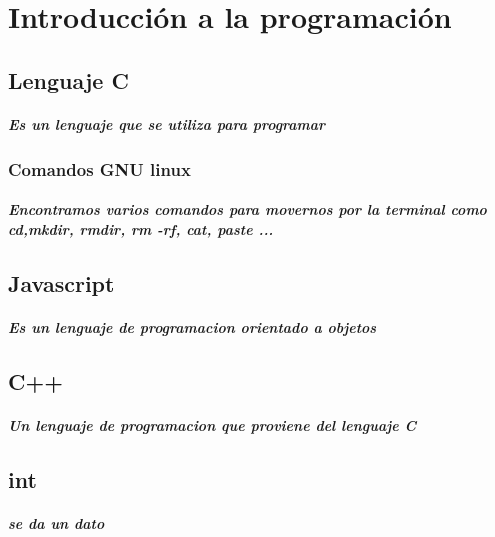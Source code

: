 \documentclass[10pt,a4paper]{book}
\begin{document}
\chapter{Introducción a la programación}
	\section{Lenguaje C} 
		\paragraph{Es un lenguaje que se utiliza para programar}
			\subsection{Comandos GNU linux}
				\paragraph{Encontramos varios comandos para movernos por la 								terminal como cd,mkdir, rmdir, rm -rf, cat, paste ...}    
	\section{Javascript}
		\paragraph{Es un lenguaje de programacion orientado a objetos}
	\section{C++}
		\paragraph{Un lenguaje de programacion que proviene del lenguaje C}
  \section{int}
  \paragraph{se da un dato}
\end{document}
